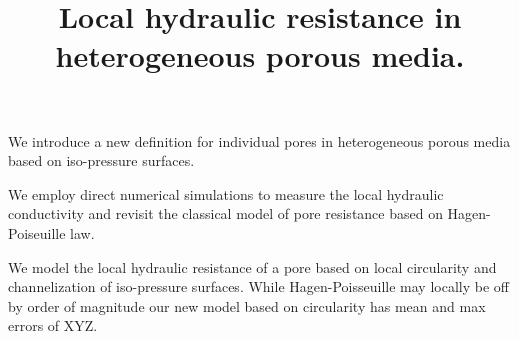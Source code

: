 \documentclass[draft]{agujournal2019}
\begin{document}
\title{Local hydraulic resistance in heterogeneous porous media.}











\begin{keypoints}
\item We introduce a new definition for individual pores in heterogeneous porous media based on iso-pressure surfaces.
\item We employ direct numerical simulations to measure the local hydraulic conductivity and revisit the classical model of pore resistance based on Hagen-Poiseuille law. 
\item We model the local hydraulic resistance of a pore based on local circularity and channelization of iso-pressure surfaces. While Hagen-Poisseuille may locally be off by order of magnitude our new model based on circularity has mean and max errors of XYZ.
\end{keypoints}
\end{document}
